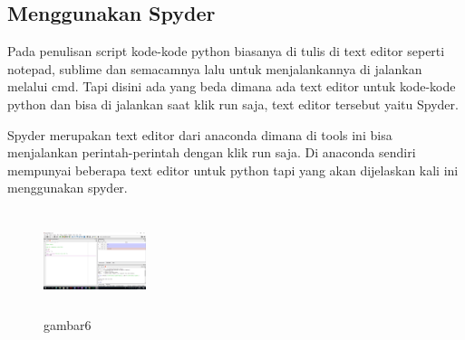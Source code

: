 \subsection{Menggunakan Spyder}
Pada penulisan script kode-kode python biasanya di tulis di text editor seperti notepad, sublime dan semacamnya lalu untuk menjalankannya di jalankan melalui cmd. Tapi disini ada yang beda dimana ada text editor untuk kode-kode python dan bisa di jalankan saat klik run saja, text editor tersebut yaitu Spyder.
\par Spyder merupakan text editor dari anaconda dimana di tools ini bisa menjalankan perintah-perintah dengan klik run saja. Di anaconda sendiri mempunyai beberapa text editor untuk python tapi yang akan dijelaskan kali ini menggunakan spyder.
\begin{figure}[!htbp]
    \centering
    \includegraphics[width=3cm,height=3cm]{figures/choi/6.png}
    \caption{gambar6}
    \label{spyder}
    \end{figure}
	

